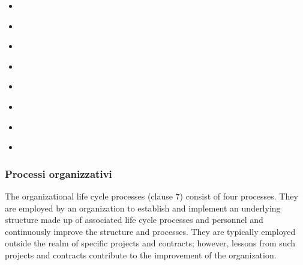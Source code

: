 \begin{itemize}
    \item 
\end{itemize}

\begin{itemize}
    \item 
\end{itemize}

\begin{itemize}
    \item 
\end{itemize}

\begin{itemize}
    \item 
\end{itemize}

\begin{itemize}
    \item 
\end{itemize}

\begin{itemize}
    \item 
\end{itemize}

\begin{itemize}
    \item 
\end{itemize}

\begin{itemize}
    \item 
\end{itemize}

\subsubsection{Processi organizzativi}
The organizational life cycle processes (clause 7) consist of four processes. They are employed by an
organization to establish and implement an underlying structure made up of associated life cycle
processes and personnel and continuously improve the structure and processes. They are typically
employed outside the realm of specific projects and contracts; however, lessons from such projects and
contracts contribute to the improvement of the organization.

